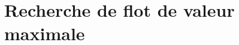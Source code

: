 \documentclass[french,10pt,t,handout]{beamer}
\begin{document}
\section{Recherche de flot de valeur maximale}

% 	
% 	
% 	
% 	


% 	
% 		
% 	
\end{document}
